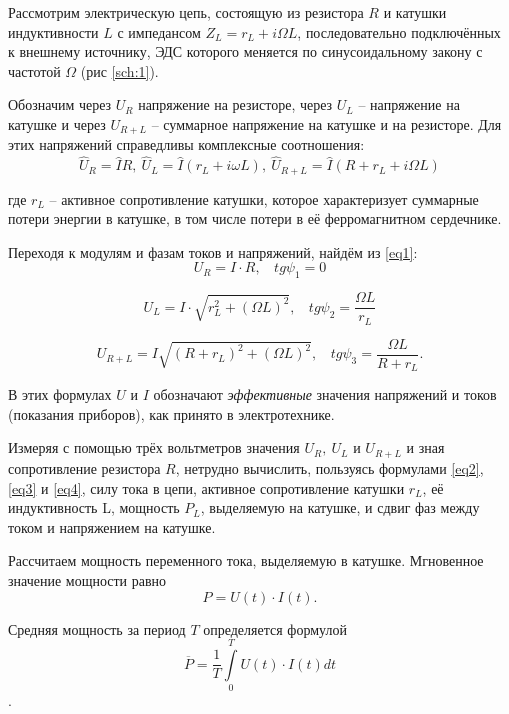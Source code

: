 \documentclass[a4paper, 12pt, twoside]{article}
\begin{document}
Рассмотрим электрическую цепь, состоящую из резистора $R$ и катушки индуктивности $L$ с импедансом $Z_L = r_L+i\Omega L$, последовательно подключённых к внешнему источнику, ЭДС которого меняется по синусоидальному закону с частотой $\Omega$ (рис \ref{sch:1}).


Обозначим через $U_R$ напряжение на резисторе, через $U_L$ -- напряжение на катушке и через $U_{R+L}$ -- суммарное напряжение на катушке и на резисторе. Для этих напряжений справедливы комплексные соотношения:
\begin{equation}
\label{eq1}
\widehat{U}_R = \widehat{I}R,~\widehat{U}_L=\widehat{I}(r_L+i\omega L),~ \widehat{U}_{R+L} = \widehat{I}(R+r_L+i\Omega L)
\end{equation}

где $r_L$ -- активное сопротивление катушки, которое характеризует суммарные потери энергии в катушке, в том числе потери в её ферромагнитном сердечнике.

Переходя к модулям и фазам токов и напряжений, найдём из \eqref{eq1}:
\begin{equation}
\label{eq2}
U_R = I \cdot R,~~~~tg \psi_1 = 0
\end{equation}

\begin{equation}
\label{eq3}
U_L = I\cdot \sqrt{r_L^2+(\Omega L)^2},~~~~ tg \psi_2 = \dfrac{\Omega L}{r_L}
\end{equation}

\begin{equation}
\label{eq4}
U_{R+L} = I\sqrt{(R+r_L)^2+(\Omega L)^2},~~~~tg \psi_3 = \dfrac{\Omega L}{R+r_L}.
\end{equation}

В этих формулах $U$ и $I$ обозначают \textit{эффективные} значения напряжений и токов (показания приборов), как принято в электротехнике.

Измеряя с помощью трёх вольтметров значения $U_R,~U_L$ и $U_{R+L}$ и зная сопротивление резистора $R$, нетрудно вычислить, пользуясь формулами \eqref{eq2}, \eqref{eq3} и \eqref{eq4}, силу тока в цепи, активное сопротивление катушки $r_L$, её индуктивность L, мощность $P_L$, выделяемую на катушке, и сдвиг фаз между током и напряжением на катушке.

Рассчитаем мощность переменного тока, выделяемую в катушке. Мгновенное значение мощности равно
$$P = U(t)\cdot I(t).$$

Средняя мощность за период $T$ определяется формулой 
$$\overline{P} = \dfrac{1}{T}\int\limits_0^T U(t) \cdot I(t) dt$$.
\end{document}

